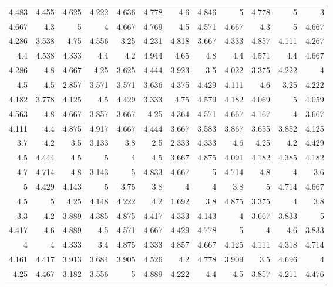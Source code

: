 \documentclass[10pt]{report}
\begin{document}
\begin{table}[!htpb]
\begin{tabular}{rrrrrrrrrrrr}
	4.483 & 4.455 & 4.625 & 4.222 & 4.636 & 4.778 & 4.6   & 4.846 & 5     & 4.778 & 5     & 3     \\
	4.667 & 4.3   & 5     & 4     & 4.667 & 4.769 & 4.5   & 4.571 & 4.667 & 4.3   & 5     & 4.667 \\
	4.286 & 3.538 & 4.75  & 4.556 & 3.25  & 4.231 & 4.818 & 3.667 & 4.333 & 4.857 & 4.111 & 4.267 \\
	4.4   & 4.538 & 4.333 & 4.4   & 4.2   & 4.944 & 4.65  & 4.8   & 4.4   & 4.571 & 4.4   & 4.667 \\
	4.286 & 4.8   & 4.667 & 4.25  & 3.625 & 4.444 & 3.923 & 3.5   & 4.022 & 3.375 & 4.222 & 4     \\
	4.5   & 4.5   & 2.857 & 3.571 & 3.571 & 3.636 & 4.375 & 4.429 & 4.111 & 4.6   & 3.25  & 4.222 \\
	4.182 & 3.778 & 4.125 & 4.5   & 4.429 & 3.333 & 4.75  & 4.579 & 4.182 & 4.069 & 5     & 4.059 \\
	4.563 & 4.8   & 4.667 & 3.857 & 3.667 & 4.25  & 4.364 & 4.571 & 4.667 & 4.167 & 4     & 3.667 \\
	4.111 & 4.4   & 4.875 & 4.917 & 4.667 & 4.444 & 3.667 & 3.583 & 3.867 & 3.655 & 3.852 & 4.125 \\
	3.7   & 4.2   & 3.5   & 3.133 & 3.8   & 2.5   & 2.333 & 4.333 & 4.6   & 4.25  & 4.2   & 4.429 \\
	4.5   & 4.444 & 4.5   & 5     & 4     & 4.5   & 3.667 & 4.875 & 4.091 & 4.182 & 4.385 & 4.182 \\
	4.7   & 4.714 & 4.8   & 3.143 & 5     & 4.833 & 4.667 & 5     & 4.714 & 4.8   & 4     & 3.6   \\
	5     & 4.429 & 4.143 & 5     & 3.75  & 3.8   & 4     & 4     & 3.8   & 5     & 4.714 & 4.667 \\
	4.5   & 5     & 4.25  & 4.148 & 4.222 & 4.2   & 1.692 & 3.8   & 4.875 & 3.375 & 4     & 3.8   \\
	3.3   & 4.2   & 3.889 & 4.385 & 4.875 & 4.417 & 4.333 & 4.143 & 4     & 3.667 & 3.833 & 5     \\
	4.417 & 4.6   & 4.889 & 4.5   & 4.571 & 4.667 & 4.429 & 4.778 & 5     & 4     & 4.6   & 3.833 \\
	4     & 4     & 4.333 & 3.4   & 4.875 & 4.333 & 4.857 & 4.667 & 4.125 & 4.111 & 4.318 & 4.714 \\
	4.161 & 4.417 & 3.913 & 3.684 & 3.905 & 4.526 & 4.2   & 4.778 & 3.909 & 3.5   & 4.696 & 4     \\
	4.25  & 4.467 & 3.182 & 3.556 & 5     & 4.889 & 4.222 & 4.4   & 4.5   & 3.857 & 4.211 & 4.476 \\

\end{tabular}
\end{table}
\end{document}

